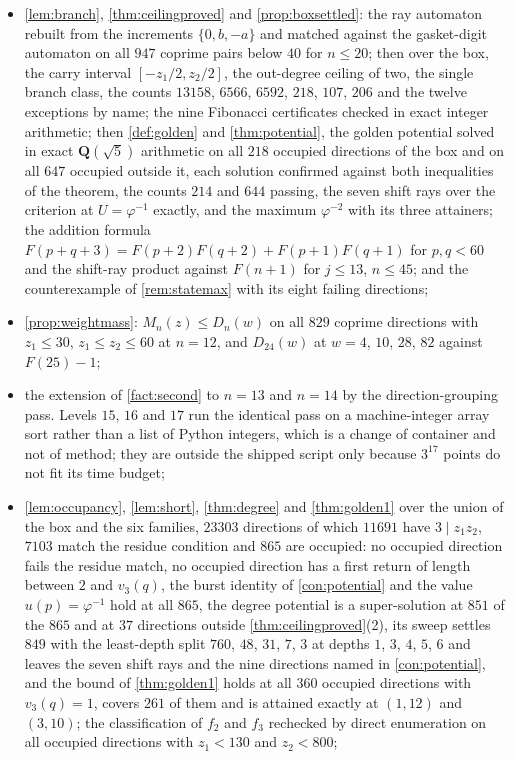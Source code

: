 \documentclass[11pt]{amsart}
\theoremstyle{definition}
\theoremstyle{remark}
\begin{document}
\begin{itemize}
\item \cref{lem:branch}, \cref{thm:ceilingproved} and \cref{prop:boxsettled}: the ray automaton rebuilt from the increments $\{0,b,-a\}$ and matched against the gasket-digit automaton on all $947$ coprime pairs below $40$ for $n\le 20$; then over the box, the carry interval $[-z_1/2,z_2/2]$, the out-degree ceiling of two, the single branch class, the counts $13158$, $6566$, $6592$, $218$, $107$, $206$ and the twelve exceptions by name; the nine Fibonacci certificates checked in exact integer arithmetic; then \cref{def:golden} and \cref{thm:potential}, the golden potential solved in exact $\mathbf{Q}(\sqrt5)$ arithmetic on all $218$ occupied directions of the box and on all $647$ occupied outside it, each solution confirmed against both inequalities of the theorem, the counts $214$ and $644$ passing, the seven shift rays over the criterion at $U=\varphi^{-1}$ exactly, and the maximum $\varphi^{-2}$ with its three attainers; the addition formula $F(p+q+3)=F(p+2)F(q+2)+F(p+1)F(q+1)$ for $p,q<60$ and the shift-ray product against $F(n+1)$ for $j\le 13$, $n\le 45$; and the counterexample of \cref{rem:statemax} with its eight failing directions;
\item \cref{prop:weightmass}: $M_n(z)\le D_n(w)$ on all $829$ coprime directions with $z_1\le 30$, $z_1\le z_2\le 60$ at $n=12$, and $D_{24}(w)$ at $w=4$, $10$, $28$, $82$ against $F(25)-1$;
\item the extension of \cref{fact:second} to $n=13$ and $n=14$ by the direction-grouping pass. Levels $15$, $16$ and $17$ run the identical pass on a machine-integer array sort rather than a list of Python integers, which is a change of container and not of method; they are outside the shipped script only because $3^{17}$ points do not fit its time budget;
\item \cref{lem:occupancy}, \cref{lem:short}, \cref{thm:degree} and \cref{thm:golden1} over the union of the box and the six families, $23303$ directions of which $11691$ have $3\mid z_1z_2$, $7103$ match the residue condition and $865$ are occupied: no occupied direction fails the residue match, no occupied direction has a first return of length between $2$ and $v_3(q)$, the burst identity of \cref{con:potential} and the value $u(p)=\varphi^{-1}$ hold at all $865$, the degree potential is a super-solution at $851$ of the $865$ and at $37$ directions outside \cref{thm:ceilingproved}(2), its sweep settles $849$ with the least-depth split $760$, $48$, $31$, $7$, $3$ at depths $1$, $3$, $4$, $5$, $6$ and leaves the seven shift rays and the nine directions named in \cref{con:potential}, and the bound of \cref{thm:golden1} holds at all $360$ occupied directions with $v_3(q)=1$, covers $261$ of them and is attained exactly at $(1,12)$ and $(3,10)$; the classification of $f_2$ and $f_3$ rechecked by direct enumeration on all occupied directions with $z_1<130$ and $z_2<800$;

\end{itemize}
\end{document}

